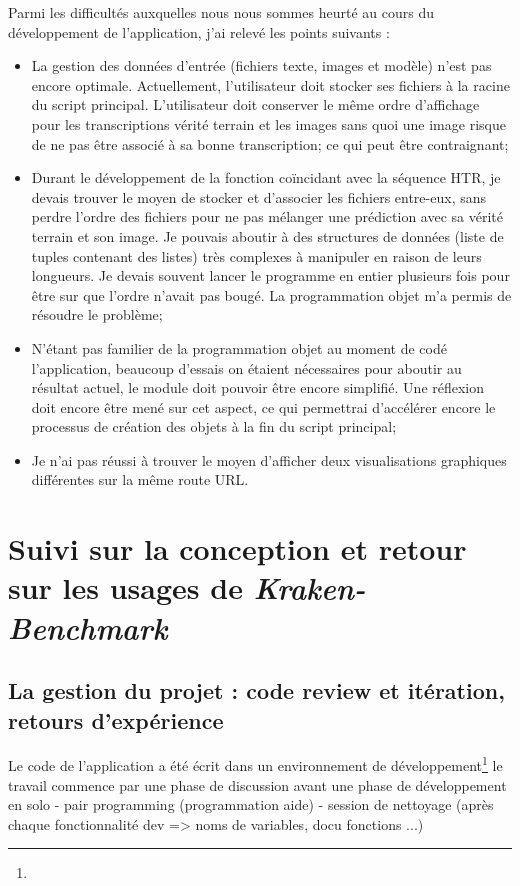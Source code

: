 Parmi les difficultés auxquelles nous nous sommes heurté au cours du développement de l'application, j'ai relevé les points suivants :

\begin{itemize}
    \item La gestion des données d'entrée (fichiers texte, images et modèle) n'est pas encore optimale. Actuellement, l'utilisateur doit stocker ses fichiers à la racine du script principal. L'utilisateur doit conserver le même ordre d'affichage pour les transcriptions vérité terrain et les images sans quoi une image risque de ne pas être associé à sa bonne transcription; ce qui peut être contraignant;
    \item Durant le développement de la fonction coïncidant avec la séquence HTR, je devais trouver le moyen de stocker et d'associer les fichiers entre-eux, sans perdre l'ordre des fichiers pour ne pas mélanger une prédiction avec sa vérité terrain et son image. Je pouvais aboutir à des structures de données (liste de tuples contenant des listes) très complexes à manipuler en raison de leurs longueurs. Je devais souvent lancer le programme en entier plusieurs fois pour être sur que l'ordre n'avait pas bougé. La programmation objet m'a permis de résoudre le problème;
    \item N'étant pas familier de la programmation objet au moment de codé l'application, beaucoup d'essais on étaient nécessaires pour aboutir au résultat actuel, le module  doit pouvoir être encore simplifié. Une réflexion doit encore être mené sur cet aspect, ce qui permettrai d'accélérer encore le processus de création des objets à la fin du script principal;
    \item Je n'ai pas réussi à trouver le moyen d'afficher deux visualisations graphiques différentes sur la même route URL. 
\end{itemize}

\section{Suivi sur la conception et retour sur les usages de \textit{Kraken-Benchmark}}

\subsection{La gestion du projet : code review et itération, retours d'expérience}

Le code de l'application a été écrit dans un environnement de développement\footnote{}  
le travail commence par une phase de discussion avant une phase de développement en solo - pair programming (programmation aide) - session de nettoyage (après chaque fonctionnalité dev => noms de variables, docu fonctions ...)

